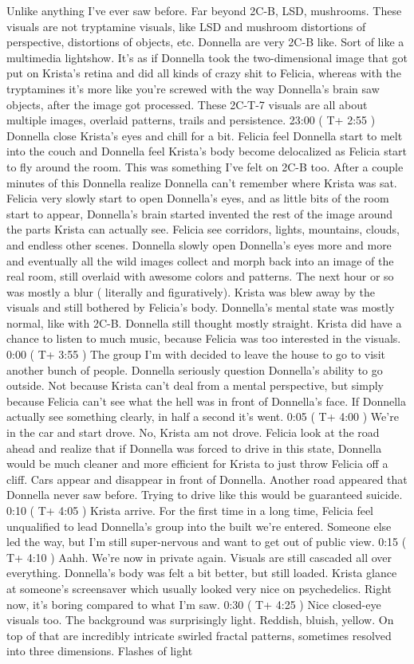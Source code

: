 \documentclass[12pt]{book}
\begin{document}
Unlike anything I've ever saw before. Far beyond 2C-B, LSD, mushrooms. These visuals are not tryptamine visuals, like LSD and mushroom distortions of perspective, distortions of objects, etc. Donnella are very 2C-B like. Sort of like a multimedia lightshow. It's as if Donnella took the two-dimensional image that got put on Krista's retina and did all kinds of crazy shit to Felicia, whereas with the tryptamines it's more like you're screwed with the way Donnella's brain saw objects, after the image got processed. These 2C-T-7 visuals are all about multiple images, overlaid patterns, trails and persistence. 23:00 ( T+ 2:55 ) Donnella close Krista's eyes and chill for a bit. Felicia feel Donnella start to melt into the couch and Donnella feel Krista's body become delocalized as Felicia start to fly around the room. This was something I've felt on 2C-B too. After a couple minutes of this Donnella realize Donnella can't remember where Krista was sat. Felicia very slowly start to open Donnella's eyes, and as little bits of the room start to appear, Donnella's brain started invented the rest of the image around the parts Krista can actually see. Felicia see corridors, lights, mountains, clouds, and endless other scenes. Donnella slowly open Donnella's eyes more and more and eventually all the wild images collect and morph back into an image of the real room, still overlaid with awesome colors and patterns. The next hour or so was mostly a blur ( literally and figuratively). Krista was blew away by the visuals and still bothered by Felicia's body. Donnella's mental state was mostly normal, like with 2C-B. Donnella still thought mostly straight. Krista did have a chance to listen to much music, because Felicia was too interested in the visuals. 0:00 ( T+ 3:55 ) The group I'm with decided to leave the house to go to visit another bunch of people. Donnella seriously question Donnella's ability to go outside. Not because Krista can't deal from a mental perspective, but simply because Felicia can't see what the hell was in front of Donnella's face. If Donnella actually see something clearly, in half a second it's went. 0:05 ( T+ 4:00 ) We're in the car and start drove. No, Krista am not drove. Felicia look at the road ahead and realize that if Donnella was forced to drive in this state, Donnella would be much cleaner and more efficient for Krista to just throw Felicia off a cliff. Cars appear and disappear in front of Donnella. Another road appeared that Donnella never saw before. Trying to drive like this would be guaranteed suicide. 0:10 ( T+ 4:05 ) Krista arrive. For the first time in a long time, Felicia feel unqualified to lead Donnella's group into the built we're entered. Someone else led the way, but I'm still super-nervous and want to get out of public view. 0:15 ( T+ 4:10 ) Aahh. We're now in private again. Visuals are still cascaded all over everything. Donnella's body was felt a bit better, but still loaded. Krista glance at someone's screensaver which usually looked very nice on psychedelics. Right now, it's boring compared to what I'm saw. 0:30 ( T+ 4:25 ) Nice closed-eye visuals too. The background was surprisingly light. Reddish, bluish, yellow. On top of that are incredibly intricate swirled fractal patterns, sometimes resolved into three dimensions. Flashes of light 
\end{document}
